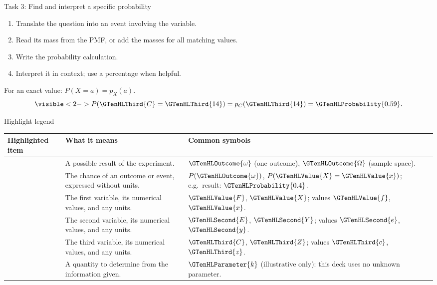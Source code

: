 \documentclass[12pt,aspectratio=169]{beamer}
\makeatletter
\renewcommand{\arraystretch}{1.22}
\newcommand{\LessonHighlightLegend}{%
  \begingroup
  \small
  \setlength{\tabcolsep}{4pt}
  \renewcommand{\arraystretch}{1.0}
  \begin{tabularx}{\linewidth}{@{}>{\raggedright\arraybackslash}p{.255\linewidth}%
    >{\raggedright\arraybackslash}X>{\raggedright\arraybackslash}p{.34\linewidth}@{}}
    \toprule
    \textbf{Highlighted item} & \textbf{What it means} & \textbf{Common symbols} \\
    \midrule
    \GTenHLOutcome{Outcome} & A possible result of the experiment. &
      $\GTenHLOutcome{\omega}$ (one outcome),\newline
      $\GTenHLOutcome{\Omega}$ (sample space). \\
    \GTenHLProbability{Probability} & The chance of an outcome or event, expressed without units. &
      $P(\GTenHLOutcome{\omega})$, $P(\GTenHLValue{X}=\GTenHLValue{x})$;\newline
      e.g.\ result: $\GTenHLProbability{0.4}$. \\
    \GTenHLValue{First variable} & The first variable, its numerical values, and any units. &
      $\GTenHLValue{F}$, $\GTenHLValue{X}$; values $\GTenHLValue{f}$, $\GTenHLValue{x}$. \\
    \GTenHLSecond{Second variable} & The second variable, its numerical values, and any units. &
      $\GTenHLSecond{E}$, $\GTenHLSecond{Y}$; values $\GTenHLSecond{e}$, $\GTenHLSecond{y}$. \\
    \GTenHLThird{Third variable} & The third variable, its numerical values, and any units. &
      $\GTenHLThird{C}$, $\GTenHLThird{Z}$; values $\GTenHLThird{c}$, $\GTenHLThird{z}$. \\
    \GTenHLParameter{Unknown parameter} & A quantity to determine from the information given. &
      $\GTenHLParameter{k}$ (illustrative only): this deck uses no unknown parameter. \\
    \bottomrule
  \end{tabularx}\par
  \endgroup
}
\makeatother
\begin{document}
\begin{frame}[t]{Task 3: Find and interpret a specific probability}
  \begin{enumerate}
    \item Translate the question into an event involving the variable.
    \item Read its mass from the PMF, or add the masses for all matching values.
    \item Write the probability calculation.
    \item Interpret it in context; use a percentage when helpful.
  \end{enumerate}
  For an exact value: $P(X=a)=p_X(a)$.
  \[
    \visible<2->{P(\GTenHLThird{C}=\GTenHLThird{14})
      =p_C(\GTenHLThird{14})=\GTenHLProbability{0.59}.}
  \]

  \medskip
\end{frame}

\begin{frame}[t]{Highlight legend}
  \LessonHighlightLegend
\end{frame}
\end{document}
